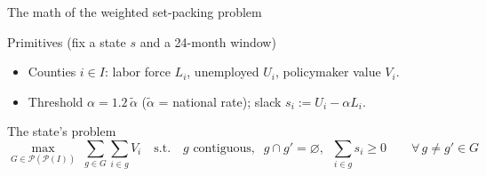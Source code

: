 \documentclass[aspectratio=169, 11pt]{beamer}
\begin{document}
\begin{frame}{The math of the weighted set-packing problem}

  \begin{block}{Primitives (fix a state $s$ and a 24-month window)}
    \begin{itemize}
      \item Counties $i \in I$: labor force $L_i$, unemployed $U_i$, policymaker value $V_i$.
      \item Threshold $\alpha = 1.2\,\tilde{\alpha}$ ($\tilde\alpha$ = national rate); slack $s_i := U_i - \alpha L_i$.
    \end{itemize}
  \end{block}

  \begin{block}{The state's problem}
    \setlength{\abovedisplayskip}{2pt}\setlength{\belowdisplayskip}{4pt}
    \begin{equation*}
      \max_{G \in \mathcal{P}(\mathcal{P}(I))} \; \sum_{g \in G} \sum_{i \in g} V_i
      \quad \text{s.t.} \quad
      g \text{ contiguous}, \;\;
      g \cap g' = \varnothing, \;\;
      \textstyle\sum_{i \in g} s_i \ge 0
      \qquad \forall\, g \neq g' \in G
    \end{equation*}
  \end{block}
\end{frame}
\end{document}
